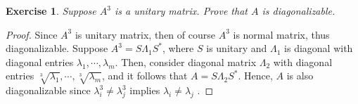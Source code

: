 \documentclass[11pt]{book}
\newtheorem{exercise}{Exercise}[section]
\theoremstyle{definition}
\numberwithin{equation}{chapter}
\begin{document}
\medskip

\begin{exercise}{\bf *}
Suppose $A^3$ is a unitary matrix. Prove that $A$ is diagonalizable.
\end{exercise}
\begin{proof}
Since $A^3$ is unitary matrix, then of course $A^3$ is normal matrix, thus diagonalizable. Suppose $A^3 = S \Lambda_1 S^*$, where $S$ is unitary and $\Lambda_1$ is diagonal with diagonal entries $\lambda_1, \cdots, \lambda_m$. Then, consider diagonal matrix $\Lambda_2$ with diagonal entries $\sqrt[3]{\lambda_1}, \cdots, \sqrt[3]{\lambda_m}$, and it follows that $A = S \Lambda_2 S^*$. Hence, $A$ is also diagonalizable since $\lambda_i^3 \neq \lambda_j^3$ implies $\lambda_i \neq \lambda_j$ \cite{22}.
\end{proof}

\medskip
\end{document}

